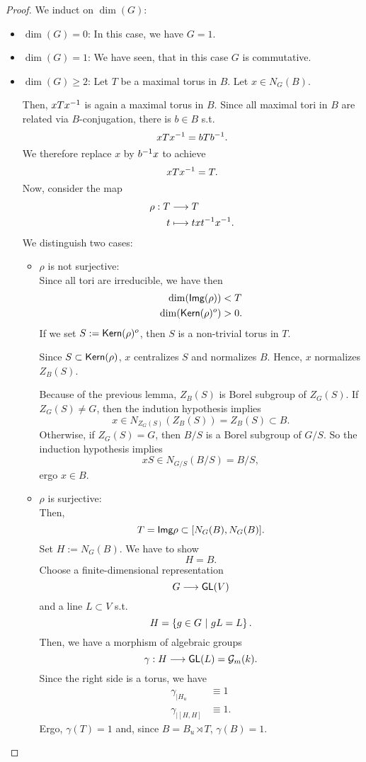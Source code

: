 \begin{proof}
	We induct on $\dim(G)$:
	\begin{itemize}
		\item $\dim (G) = 0$: In this case, we have $G = 1$.
		\item $\dim(G) = 1$: We have seen, that in this case $G$ is commutative.
		\item $\dim(G) \geq 2$:
		Let $T$ be a maximal torus in $B$. Let $x \in N_G(B)$.
		
		Then, $xTx^{-1}$ is again a maximal torus in $B$. Since all maximal tori in $B$ are related via $B$-conjugation, there is $b \in B$ s.t.
		\[ xTx^{-1} = bTb^{-1}. \]
		We therefore replace $x$ by $b^{-1} x$ to achieve
		\[ xTx^{-1} = T. \]
		Now, consider the map
		\begin{align*}
		\rho : T & \overset{}{\longrightarrow} T\\
		t &\longmapsto txt^{-1} x^{-1}.
		\end{align*}
		We distinguish two cases:
		\begin{itemize}
			\item $\rho$ is not surjective:\\
			Since all tori are irreducible, we have then
			\begin{align*}
			\dim(\textsf{Img}(\rho)) &< T\\
			\dim(\textsf{Kern}(\rho)^o) & >0.\\
			\end{align*}
			If we set $S:=\textsf{Kern}(\rho)^o$, then $S$ is a non-trivial torus in $T$.
			
			Since $S \subset \textsf{Kern} (\rho)$, $x$ centralizes $S$ and normalizes $B$. Hence, $x$ normalizes $Z_B(S)$.
			
			Because of the previous lemma, $Z_B(S)$ is Borel subgroup of $Z_G(S)$. If $Z_G(S) \neq G$, then the indution hypothesis implies
			\[ x \in N_{Z_G(S)}(Z_B(S)) = Z_B(S) \subset B. \]
			Otherwise, if $Z_G(S) = G$, then $B/S$ is a Borel subgroup of $G/S$. So the induction hypothesis implies
			\[ xS \in N_{G/S} (B/S) = B/S, \]
			ergo $x \in B$.
			\item $\rho$ is surjective:\\
			Then,
			\[ T = \textsf{Img} \rho \subset [N_G(B), N_G(B)]. \]
			Set $H := N_G(B)$. We have to show
			\[ H =B. \]
			Choose a finite-dimensional representation
			\[ G \overset{}{\longrightarrow} \textsf{GL}(V) \]
			and a line $L \subset V$ s.t.
			\[ H = \left\lbrace g \in G ~ | ~ gL = L\right\rbrace. \]
			Then, we have a morphism of algebraic groups
			\[ \gamma : H \overset{}{\longrightarrow} \textsf{GL}(L) = \mathcal{G}_m(k). \]
			Since the right side is a torus, we have
			\begin{align*}
			\gamma_{| H_u} &\equiv 1\\
			\gamma_{|[H,H]} & \equiv 1.
			\end{align*}
			Ergo, $\gamma(T) = 1$ and, since $B = B_u \rtimes T$, $\gamma(B) = 1$.
			

\end{itemize}
\end{itemize}
\end{proof}
